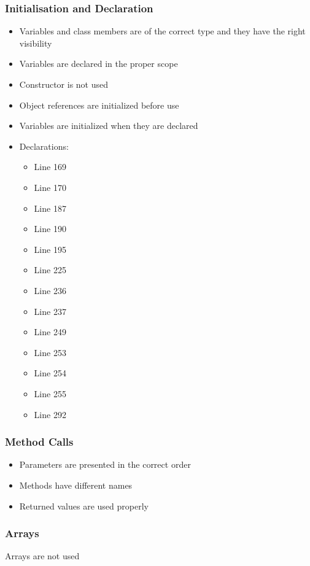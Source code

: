 \subsubsection{Initialisation and Declaration}
\begin{itemize}
\item Variables and class members are of the correct type and they have the right visibility
\item Variables are declared in the proper scope
\item Constructor is not used
\item Object references are initialized before use
\item Variables are initialized when they are declared
\item Declarations:
\begin{itemize}
\item Line 169
\item Line 170
\item Line 187
\item Line 190
\item Line 195
\item Line 225
\item Line 236
\item Line 237
\item Line 249
\item Line 253
\item Line 254
\item Line 255
\item Line 292
\end{itemize}
\end{itemize}

\subsubsection{Method Calls}
\begin{itemize}
\item Parameters are presented in the correct order
\item Methods have different names
\item Returned values are used properly
\end{itemize}

\subsubsection{Arrays}
Arrays are not used
